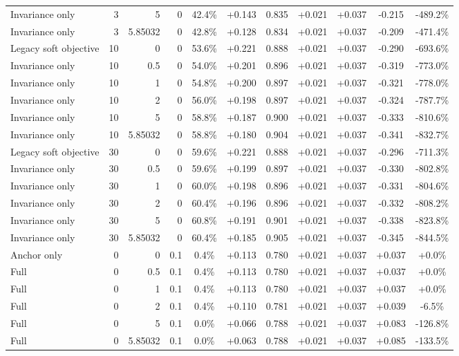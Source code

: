 \begin{table}[htbp]
\begin{tabular}{lrrrccccccc}
Invariance only & 3 & 5 & 0 & 42.4\% & +0.143 & 0.835 & +0.021 & +0.037 & -0.215 & -489.2\% \\
Invariance only & 3 & 5.85032 & 0 & 42.8\% & +0.128 & 0.834 & +0.021 & +0.037 & -0.209 & -471.4\% \\
Legacy soft objective & 10 & 0 & 0 & 53.6\% & +0.221 & 0.888 & +0.021 & +0.037 & -0.290 & -693.6\% \\
Invariance only & 10 & 0.5 & 0 & 54.0\% & +0.201 & 0.896 & +0.021 & +0.037 & -0.319 & -773.0\% \\
Invariance only & 10 & 1 & 0 & 54.8\% & +0.200 & 0.897 & +0.021 & +0.037 & -0.321 & -778.0\% \\
Invariance only & 10 & 2 & 0 & 56.0\% & +0.198 & 0.897 & +0.021 & +0.037 & -0.324 & -787.7\% \\
Invariance only & 10 & 5 & 0 & 58.8\% & +0.187 & 0.900 & +0.021 & +0.037 & -0.333 & -810.6\% \\
Invariance only & 10 & 5.85032 & 0 & 58.8\% & +0.180 & 0.904 & +0.021 & +0.037 & -0.341 & -832.7\% \\
Legacy soft objective & 30 & 0 & 0 & 59.6\% & +0.221 & 0.888 & +0.021 & +0.037 & -0.296 & -711.3\% \\
Invariance only & 30 & 0.5 & 0 & 59.6\% & +0.199 & 0.897 & +0.021 & +0.037 & -0.330 & -802.8\% \\
Invariance only & 30 & 1 & 0 & 60.0\% & +0.198 & 0.896 & +0.021 & +0.037 & -0.331 & -804.6\% \\
Invariance only & 30 & 2 & 0 & 60.4\% & +0.196 & 0.896 & +0.021 & +0.037 & -0.332 & -808.2\% \\
Invariance only & 30 & 5 & 0 & 60.8\% & +0.191 & 0.901 & +0.021 & +0.037 & -0.338 & -823.8\% \\
Invariance only & 30 & 5.85032 & 0 & 60.4\% & +0.185 & 0.905 & +0.021 & +0.037 & -0.345 & -844.5\% \\
Anchor only & 0 & 0 & 0.1 & 0.4\% & +0.113 & 0.780 & +0.021 & +0.037 & +0.037 & +0.0\% \\
Full & 0 & 0.5 & 0.1 & 0.4\% & +0.113 & 0.780 & +0.021 & +0.037 & +0.037 & +0.0\% \\
Full & 0 & 1 & 0.1 & 0.4\% & +0.113 & 0.780 & +0.021 & +0.037 & +0.037 & +0.0\% \\
Full & 0 & 2 & 0.1 & 0.4\% & +0.110 & 0.781 & +0.021 & +0.037 & +0.039 & -6.5\% \\
Full & 0 & 5 & 0.1 & 0.0\% & +0.066 & 0.788 & +0.021 & +0.037 & +0.083 & -126.8\% \\
Full & 0 & 5.85032 & 0.1 & 0.0\% & +0.063 & 0.788 & +0.021 & +0.037 & +0.085 & -133.5\% \\

\end{tabular}
\end{table}

